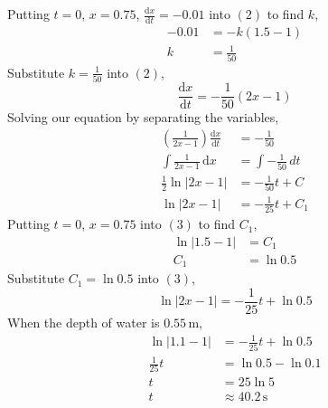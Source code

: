 \documentclass[11pt,a4paper]{book}
\begin{document}
\begin{example}
\begin{enumerate}[label=(\alph*)]
Putting $t=0$, $x=0.75$, ${\displaystyle \frac{\mathrm{d}x}{\mathrm{d}t}=-0.01}$
into $\left(2\right)$ to find $k$,
\begin{align*}
-0.01 & =-k\left(1.5-1\right)\\
k & =\frac{1}{50}
\end{align*}
Substitute ${\displaystyle k=\frac{1}{50}}$ into $\left(2\right)$,
\[
\frac{\mathrm{d}x}{\mathrm{d}t}=-\frac{1}{50}\left(2x-1\right)
\]
Solving our equation by separating the variables,
\begin{align*}
\left(\frac{1}{2x-1}\right)\frac{\mathrm{d}x}{\mathrm{d}t} & =-\frac{1}{50}\\
\int\frac{1}{2x-1}\, \mathrm{d}x & =\int-\frac{1}{50}\,dt\\
\frac{1}{2}\ln\left|2x-1\right| & =-\frac{1}{50}t+C\\
\ln\left|2x-1\right| & =-\frac{1}{25}t+C_{1}\tag{3}
\end{align*}
Putting $t=0$, $x=0.75$ into $\left(3\right)$ to find $C_{1}$,
\begin{align*}
\ln\left|1.5-1\right| & =C_{1}\\
C_{1} & =\ln0.5
\end{align*}
Substitute $C_{1}=\ln0.5$ into $\left(3\right)$,
\[
\ln\left|2x-1\right|=-\frac{1}{25}t+\ln0.5
\]
When the depth of water is $0.55\,\text{m}$,
\begin{align*}
\ln\left|1.1-1\right| & =-\frac{1}{25}t+\ln0.5\\
\frac{1}{25}t & =\ln0.5-\ln0.1\\
t & =25\ln5\\
t & \approx40.2\,\text{s}
\end{align*}

\end{enumerate}

\end{example}



\end{document}
